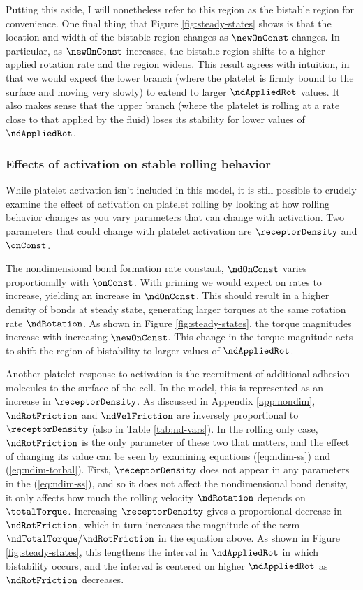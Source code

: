 Putting this aside, I will nonetheless refer to this region as the
bistable region for convenience. One final thing that Figure
\ref{fig:steady-states} shows is that the location and width of the
bistable region changes as $\newOnConst$ changes. In particular, as
$\newOnConst$ increases, the bistable region shifts to a higher applied
rotation rate and the region widens. This result agrees with
intuition, in that we would expect the lower branch (where the
platelet is firmly bound to the surface and moving very slowly) to
extend to larger $\ndAppliedRot$ values. It also makes sense that the
upper branch (where the platelet is rolling at a rate close to that
applied by the fluid) loses its stability for lower values of
$\ndAppliedRot$.

\subsubsection{Effects of activation on stable rolling behavior}
\label{sec:effects-activation}

While platelet activation isn't included in this model, it is still
possible to crudely examine the effect of activation on platelet
rolling by looking at how rolling behavior changes as you vary
parameters that can change with activation. Two parameters that could
change with platelet activation are $\receptorDensity$ and
$\onConst$.

The nondimensional bond formation rate constant, $\ndOnConst$ varies
proportionally with $\onConst$. With priming we would expect on rates
to increase, yielding an increase in $\ndOnConst$. This should result
in a higher density of bonds at steady state, generating larger
torques at the same rotation rate $\ndRotation$. As shown in Figure
\ref{fig:steady-states}, the torque magnitudes increase with
increasing $\newOnConst$. This change in the torque magnitude acts to
shift the region of bistability to larger values of $\ndAppliedRot$.

Another platelet response to activation is the recruitment of
additional adhesion mole\-cules to the surface of the cell. In the
model, this is represented as an increase in $\receptorDensity$. As
discussed in Appendix \ref{app:nondim}, $\ndRotFriction$ and
$\ndVelFriction$ are inversely proportional to $\receptorDensity$
(also in Table \ref{tab:nd-vars}). In the rolling only case,
$\ndRotFriction$ is the only parameter of these two that matters, and
the effect of changing its value can be seen by examining equations
(\ref{eq:ndim-ss}) and (\ref{eq:ndim-torbal}). First,
$\receptorDensity$ does not appear in any parameters in the
(\ref{eq:ndim-ss}), and so it does not affect the nondimensional bond
density, it only affects how much the rolling velocity $\ndRotation$
depends on $\totalTorque$. Increasing $\receptorDensity$ gives a
proportional decrease in $\ndRotFriction$, which in turn increases the
magnitude of the term $\ndTotalTorque/\ndRotFriction$ in the equation
above. As shown in Figure \ref{fig:steady-states}, this lengthens the
interval in $\ndAppliedRot$ in which bistability occurs, and the
interval is centered on higher $\ndAppliedRot$ as $\ndRotFriction$
decreases.

